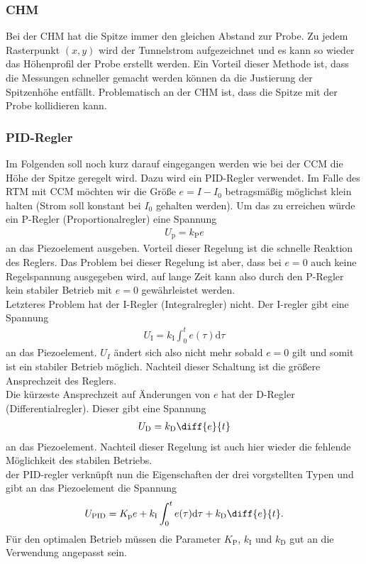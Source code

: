 \subsubsection{CHM}
Bei der CHM hat die Spitze immer den gleichen Abstand zur Probe. Zu jedem Rasterpunkt $(x,y)$ wird der Tunnelstrom aufgezeichnet und es kann so wieder das Höhenprofil der Probe erstellt werden. Ein Vorteil dieser Methode ist, dass die Messungen schneller gemacht werden können da die Justierung der Spitzenhöhe entfällt. Problematisch an der CHM ist, dass die Spitze mit der Probe kollidieren kann.

\subsubsection{PID-Regler}
Im Folgenden soll noch kurz darauf eingegangen werden wie bei der CCM die Höhe der Spitze geregelt wird. Dazu wird ein PID-Regler verwendet. Im Falle des RTM mit CCM möchten wir die Größe $e=I-I_0$ betragsmäßig möglichst klein halten (Strom soll konstant bei $I_0$ gehalten werden). Um das zu erreichen würde ein P-Regler (Proportionalregler) eine Spannung 
\begin{align*}
  U_\mathrm{p}=k_\mathrm{P}e
\end{align*} 
an das Piezoelement ausgeben. Vorteil dieser Regelung ist die schnelle Reaktion des Reglers. Das Problem bei dieser Regelung ist aber, dass bei $e=0$ auch keine Regelspannung ausgegeben wird, auf lange Zeit kann also durch den P-Regler kein stabiler Betrieb mit $e=0$ gewährleistet werden.\\
Letzteres Problem hat der I-Regler (Integralregler) nicht. Der I-regler gibt eine Spannung
\begin{align*}
  U_\mathrm{I}=k_\mathrm{I}\int_0^t e(\tau) \mathrm{d}\tau 
\end{align*}
an das Piezoelement. $U_I$ ändert sich also nicht mehr sobald $e=0$ gilt und somit ist ein stabiler Betrieb möglich. Nachteil dieser Schaltung ist die größere Ansprechzeit des Reglers. \\
Die kürzeste Ansprechzeit auf Änderungen von $e$ hat der D-Regler (Differentialregler). Dieser gibt eine Spannung 
\begin{align*}
  U_\mathrm{D}=k_\mathrm{D} \diff{e}{t}
\end{align*}
an das Piezoelement. Nachteil dieser Regelung ist auch hier wieder die fehlende Möglichkeit des stabilen Betriebs. \\
der PID-regler verknüpft nun die Eigenschaften der drei vorgstellten Typen und gibt an das Piezoelement die Spannung
\begin{align*}
  U_\mathrm{PID}=K_\mathrm{p}e + k_\mathrm{I}\int_0^t e(\tau) \mathrm{d}\tau + k_\mathrm{D} \diff{e}{t}.
\end{align*}
Für den optimalen Betrieb müssen die Parameter $K_\mathrm{P}$, $k_\mathrm{I}$ und $k_\mathrm{D}$ gut an die Verwendung angepasst sein.

